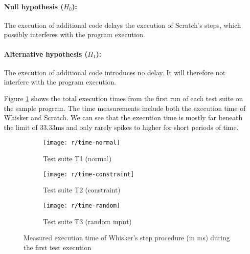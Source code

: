 \clearpage

\paragraph{Null hypothesis ($H_0$):}
The execution of additional code delays the execution of Scratch's steps, which possibly interferes with the program execution.
\vspace{-\medskipamount}
\paragraph{Alternative hypothesis ($H_1$):}
The execution of additional code introduces no delay. It will therefore not interfere with the program execution.
\parspace

\noindent Figure \ref{fig:time_line_plot} shows the total execution times
from the first run of each test suite on the sample program.
The time measurements include both the execution time of Whisker and Scratch.
We can see that the execution time is mostly far beneath the limit of $33.33\text{ms}$
and only rarely spikes to higher for short periods of time.
\parspace

\begin{figure}[htpb]
    \centering

    \begin{subfigure}{\textwidth}
        \centering
        \texttt{[image: r/time-normal]}
        \vspace{-\medskipamount}
        \caption{Test suite T1 (normal)}
    \end{subfigure}

    \begin{subfigure}{\textwidth}
        \centering
        \texttt{[image: r/time-constraint]}
        \vspace{-\medskipamount}
        \caption{Test suite T2 (constraint)}
    \end{subfigure}

    \begin{subfigure}{\textwidth}
        \centering
        \texttt{[image: r/time-random]}
        \vspace{-\medskipamount}
        \caption{Test suite T3 (random input)}
    \end{subfigure}

    \caption{Measured execution time of Whisker's step procedure (in ms) during the first test execution}
    \label{fig:time_line_plot}
\end{figure}

